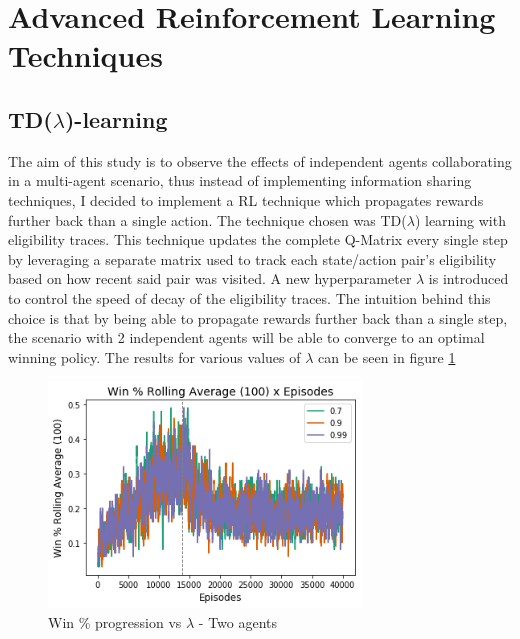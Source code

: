 \documentclass[10pt]{article}
\begin{document}
\section{Advanced Reinforcement Learning Techniques}
    \subsection{TD($\lambda$)-learning}
    The aim of this study is to observe the effects of independent agents collaborating in a multi-agent scenario, thus instead of implementing information sharing techniques, I decided to implement a RL technique which propagates rewards further back than a single action. The technique chosen was TD($\lambda$) learning with eligibility traces. This technique updates the complete Q-Matrix every single step by leveraging a separate matrix used to track each state/action pair's eligibility based on how recent said pair was visited. A new hyperparameter $\lambda$ is introduced to control the speed of decay of the eligibility traces. The intuition behind this choice is that by being able to propagate rewards further back than a single step, the scenario with 2 independent agents will be able to converge to an optimal winning policy. The results for various values of $\lambda$ can be seen in figure \ref{fig:expII:winning}

    \begin{figure}[h]
        \centering
        \includegraphics[height=6cm]{Images/exp_II/1_winning.png}
        \caption{Win \% progression vs $\lambda$ - Two agents}
        \label{fig:expII:winning}
    \end{figure}
\end{document}
